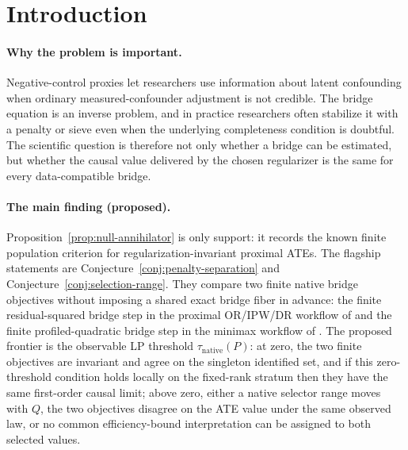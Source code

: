 \documentclass[11pt]{article}
\theoremstyle{definition}
\theoremstyle{plain}
\theoremstyle{remark}
\begin{document}
\section{Introduction}
\paragraph{Why the problem is important.}
Negative-control proxies let researchers use information about latent
confounding when ordinary measured-confounder adjustment is not credible.
The bridge equation is an inverse problem, and in practice researchers often
stabilize it with a penalty or sieve even when the underlying completeness
condition is doubtful.  The scientific question is therefore not only whether
a bridge can be estimated, but whether the causal value delivered by the
chosen regularizer is the same for every data-compatible bridge.

\paragraph{The main finding (proposed).}
Proposition~\ref{prop:null-annihilator} is only support: it records the
known finite population criterion for regularization-invariant proximal ATEs.
The flagship statements are Conjecture~\ref{conj:penalty-separation} and
Conjecture~\ref{conj:selection-range}.  They compare two finite native
bridge objectives without imposing a shared exact bridge fiber in advance:
the finite residual-squared bridge step in the proximal OR/IPW/DR workflow of
\citet{CuiPuShiMiaoTchetgen2024JASA} and the finite profiled-quadratic bridge
step in the minimax workflow of \citet{KallusMaoUehara2021MinimaxNC}.  The
proposed frontier is the observable LP threshold
\(\tau_{\mathrm{native}}(P)\): at zero, the two finite objectives are
invariant and agree on the singleton identified set, and if this zero-threshold
condition holds locally on the fixed-rank stratum then they have the same
first-order causal limit; above zero, either a
native selector range moves with \(Q\), the two objectives disagree on the ATE
value under the same observed law, or no common efficiency-bound
interpretation can be assigned to both selected values.
\end{document}
